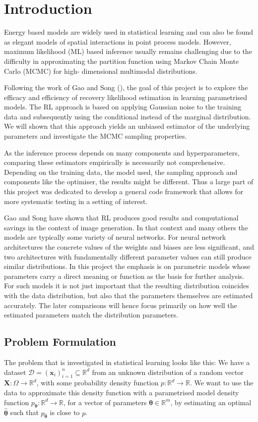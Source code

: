 \section{Introduction}

Energy based models are widely used in statistical learning and can also be found as elegant models of spatial interactions in point process models. 
However, maximum likelihood (ML) based inference usually remains challenging due to the difficulty in approximating the partition function using Markov Chain Monte Carlo (MCMC) for high- dimensional multimodal distributions.

Following the work of Gao and Song (\cite{Gao-Song2020}), the goal of this project is to explore the efficacy and efficiency of recovery likelihood estimation in learning parametrised models.
The RL approach is based on applying Gaussian noise to the training data and subsequently using the conditional instead of the marginal distribution.
We will shown that this approach yields an unbiased estimator of the underlying parameters and investigate the MCMC sampling properties. 

As the inference process depends on many components and hyperparameters, comparing these estimators empirically is necessarily not comprehensive.
Depending on the training data, the model used, the sampling approach and components like the optimiser, the results might be different.
Thus a large part of this project was dedicated to develop a general code framework that allows for more systematic testing in a setting of interest.

Gao and Song have shown that RL produces good results and computational savings in the context of image generation.
In that context and many others the models are typically some variety of neural networks.
For neural network architectures the concrete values of the weights and biases are less significant, 
and two architectures with fundamentally different parameter values can still produce similar distributions.
In this project the emphasis is on parametric models whose parameters carry a direct meaning or function as the basis for further analysis.
For such models it is not just important that the resulting distribution coincides with the data distribution, 
but also that the parameters themselves are estimated accurately.
The later comparisons will hence focus primarily on how well the estimated parameters match the distribution parameters.

\subsection{Problem Formulation}
The problem that is investigated in statistical learning looks like this:
We have a dataset $\mathcal{D} = (\bm{x}_i)_{i = 1}^n \subseteq \mathbb{R}^d$ from an unknown distribution of a random vector $\bm{X} : \Omega \to \mathbb{R}^d$,
with some probability density function $p : \mathbb{R}^d \to \mathbb{R}$.
We want to use the data to approximate this density function with a parametrised model density function $p_{\bm{\theta}}: \mathbb{R}^d \to \mathbb{R}$,
for a vector of parameters $\bm{\theta} \in \mathbb{R}^m$, by estimating an optimal $\hat{\bm{\theta}}$ such that $p_{ \hat{\bm{\theta}} }$ is close to $p$.


